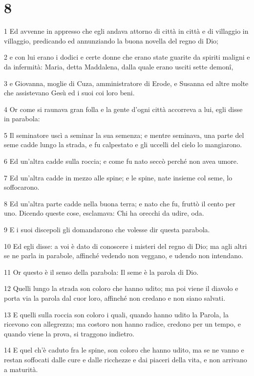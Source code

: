 \chapter{8}

\par 1 Ed avvenne in appresso che egli andava attorno di città in città e di villaggio in villaggio, predicando ed annunziando la buona novella del regno di Dio;
\par 2 e con lui erano i dodici e certe donne che erano state guarite da spiriti maligni e da infermità: Maria, detta Maddalena, dalla quale erano usciti sette demonî,
\par 3 e Giovanna, moglie di Cuza, amministratore di Erode, e Susanna ed altre molte che assistevano Gesù ed i suoi coi loro beni.
\par 4 Or come si raunava gran folla e la gente d'ogni città accorreva a lui, egli disse in parabola:
\par 5 Il seminatore uscì a seminar la sua semenza; e mentre seminava, una parte del seme cadde lungo la strada, e fu calpestato e gli uccelli del cielo lo mangiarono.
\par 6 Ed un'altra cadde sulla roccia; e come fu nato seccò perché non avea umore.
\par 7 Ed un'altra cadde in mezzo alle spine; e le spine, nate insieme col seme, lo soffocarono.
\par 8 Ed un'altra parte cadde nella buona terra; e nato che fu, fruttò il cento per uno. Dicendo queste cose, esclamava: Chi ha orecchi da udire, oda.
\par 9 E i suoi discepoli gli domandarono che volesse dir questa parabola.
\par 10 Ed egli disse: a voi è dato di conoscere i misteri del regno di Dio; ma agli altri se ne parla in parabole, affinché vedendo non veggano, e udendo non intendano.
\par 11 Or questo è il senso della parabola: Il seme è la parola di Dio.
\par 12 Quelli lungo la strada son coloro che hanno udito; ma poi viene il diavolo e porta via la parola dal cuor loro, affinché non credano e non siano salvati.
\par 13 E quelli sulla roccia son coloro i quali, quando hanno udito la Parola, la ricevono con allegrezza; ma costoro non hanno radice, credono per un tempo, e quando viene la prova, si traggono indietro.
\par 14 E quel ch'è caduto fra le spine, son coloro che hanno udito, ma se ne vanno e restan soffocati dalle cure e dalle ricchezze e dai piaceri della vita, e non arrivano a maturità.
